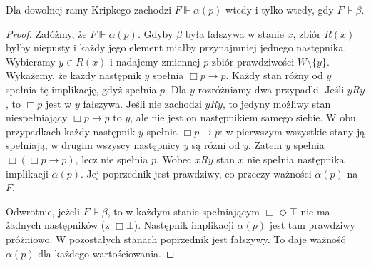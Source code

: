 \begin{lemat}
\label{lem:ncl-kripke-vb-frame-consequence}
Dla dowolnej ramy Kripkego zachodzi
$F\Vdash\alpha(p)$ wtedy i tylko wtedy, gdy
$F\Vdash\beta$.
\end{lemat}
\begin{proof}
Załóżmy, że $F\Vdash\alpha(p)$.
Gdyby $\beta$ była fałszywa w stanie $x$,
zbiór $R(x)$ byłby niepusty i każdy jego
element miałby przynajmniej jednego następnika.
Wybieramy $y\in R(x)$ i nadajemy zmiennej
$p$ zbiór prawdziwości $W\setminus\{y\}$.
Wykażemy, że każdy następnik $y$ spełnia
$\Box p\to p$. Każdy stan różny od $y$
spełnia tę implikację, gdyż spełnia $p$.
Dla $y$ rozróżniamy dwa przypadki.
Jeśli $yRy$, to $\Box p$ jest w $y$ fałszywa.
Jeśli nie zachodzi $yRy$, to jedyny możliwy
stan niespełniający $\Box p\to p$ to $y$,
ale nie jest on następnikiem samego siebie.
W obu przypadkach każdy następnik $y$
spełnia $\Box p\to p$: w pierwszym
wszystkie stany ją spełniają, w drugim
wszyscy następnicy $y$ są różni od $y$.
Zatem $y$ spełnia $\Box(\Box p\to p)$,
lecz nie spełnia $p$. Wobec $xRy$ stan $x$
nie spełnia następnika implikacji $\alpha(p)$.
Jej poprzednik jest prawdziwy, co przeczy
ważności $\alpha(p)$ na $F$.

Odwrotnie, jeżeli $F\Vdash\beta$, to
w każdym stanie spełniającym $\Box\Diamond\top$
nie ma żadnych następników (z $\Box\bot$).
Następnik implikacji $\alpha(p)$ jest tam prawdziwy
próżniowo. W pozostałych stanach poprzednik
jest fałszywy. To daje ważność $\alpha(p)$
dla każdego wartościowania.
\end{proof}

